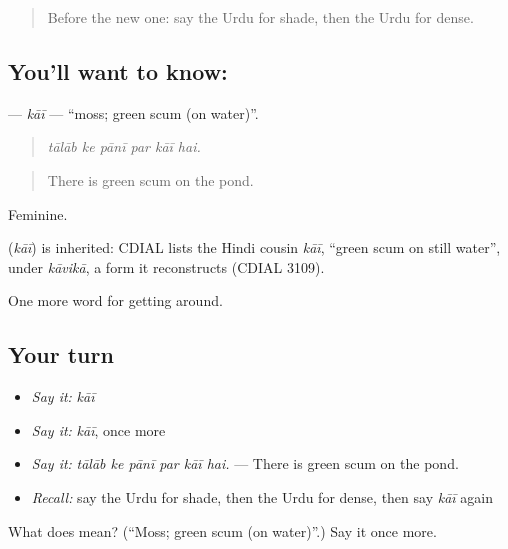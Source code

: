 \begin{quote}
Before the new one: say the Urdu for shade, then the Urdu for dense.
\end{quote}

\subsection*{You'll want to know: }
\textbf{} — \emph{kāī} — \textquotedblleft{}moss; green scum (on water)\textquotedblright{}.

\begin{quote}
     
\end{quote}

\begin{quote}
\emph{tālāb ke pānī par kāī hai.}
\end{quote}

\begin{quote}
There is green scum on the pond.
\end{quote}

Feminine.

\begin{cousinweb}
\textbf{} (\emph{kāī}) is inherited: CDIAL lists the Hindi cousin \emph{kāī}, \textquotedblleft{}green scum on still water\textquotedblright{}, under \emph{kāvikā}, a form it reconstructs (CDIAL 3109).
\end{cousinweb}

\begin{grammarlens}[title={What you've built}]
One more word for getting around.
\end{grammarlens}

\subsection*{Your turn}
\begin{itemize}
\raggedright
  \item \emph{Say it:} \emph{kāī}
  \item \emph{Say it:} \emph{kāī}, once more
  \item \emph{Say it:} \emph{tālāb ke pānī par kāī hai.} — There is green scum on the pond.
  \item \emph{Recall:} say the Urdu for shade, then the Urdu for dense, then say \emph{kāī} again
\end{itemize}

\begin{tcolorbox}[breakable,colback=teal!4,colframe=teal!35!black,title={Before you move on}]
What does  mean? (\textquotedblleft{}Moss; green scum (on water)\textquotedblright{}.) Say it once more.
\end{tcolorbox}
